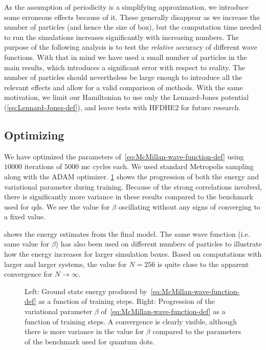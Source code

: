 \documentclass[Thesis.tex]{subfiles}
\begin{document}
\noindent As the assumption of periodicity is a simplifying approximation, we
introduce some erroneous effects because of it. These generally disappear as we
increase the number of particles (and hence the size of box), but the
computation time needed to run the simulations increases significantly with
increasing numbers. The purpose of the following analysis is to test the
\emph{relative} accuracy of different wave functions. With that in mind we have
used a small number of particles in the main results, which introduces a
significant error with respect to reality. The number of particles should nevertheless
be large enough to introduce all the relevant effects and allow for a valid
comparison of methods. With the same motivation, we limit our Hamiltonian to use
only the Lennard-Jones potential (\cref{eq:Lennard-Jones-def}), and leave tests
with HFDHE2 for future research.


\subsection{Optimizing}

We have optimized the parameters of~\cref{eq:McMillan-wave-function-def} using $\num{10000}$
iterations of $\num{5000}$ \gls{mc} cycles each. We used standard Metropolis sampling
along with the ADAM optimizer. \cref{fig:He-benchmark-training} shows the
progression of both the energy and variational parameter during training.
Because of the strong correlations involved, there is significantly more
variance in these results compared to the benchmark used for \glspl{qd}. We
see the value for $\beta$ oscillating without any signs of converging to a
fixed value.

 shows the energy estimates from the final model.
The same wave function (i.e. same value for $\beta$) has also been used on
different numbers of particles to illustrate how the energy increases for larger
simulation boxes. Based on computations with larger and larger systems, the
value for $N = 256$ is quite close to the apparent convergence for $N\to\infty$.

\begin{figure}[h]
  \centering
  \resizebox{\linewidth}{!}{%
    
  }
  \caption[Learning progression of McMillan wave function on $^4$He]{\label{fig:He-benchmark-training}Left: Ground state energy produced by~\cref{eq:McMillan-wave-function-def}
    as a function of training steps. Right: Progression of the variational
    parameter $\beta$ of~\cref{eq:McMillan-wave-function-def} as a function of
    training steps. A convergence is clearly visible, although there is more
    variance in the value for $\beta$ compared to the parameters of the
    benchmark used for quantum dots.}
\end{figure}
\end{document}
